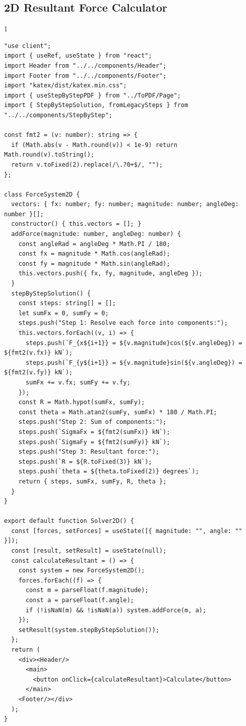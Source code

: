 \subsection*{2D Resultant Force Calculator}
\begin{spacing}{1}
\begin{Verbatim}[breaklines=true, breaksymbolleft={}, breaksymbolright={}]
"use client";
import { useRef, useState } from "react";
import Header from "../../components/Header";
import Footer from "../../components/Footer";
import "katex/dist/katex.min.css";
import { useStepByStepPDF } from "../ToPDF/Page";
import { StepByStepSolution, fromLegacySteps } from "../../components/StepByStep";

const fmt2 = (v: number): string => {
  if (Math.abs(v - Math.round(v)) < 1e-9) return Math.round(v).toString();
  return v.toFixed(2).replace(/\.?0+$/, "");
};

class ForceSystem2D {
  vectors: { fx: number; fy: number; magnitude: number; angleDeg: number }[];
  constructor() { this.vectors = []; }
  addForce(magnitude: number, angleDeg: number) {
    const angleRad = angleDeg * Math.PI / 180;
    const fx = magnitude * Math.cos(angleRad);
    const fy = magnitude * Math.sin(angleRad);
    this.vectors.push({ fx, fy, magnitude, angleDeg });
  }
  stepByStepSolution() {
    const steps: string[] = [];
    let sumFx = 0, sumFy = 0;
    steps.push("Step 1: Resolve each force into components:");
    this.vectors.forEach((v, i) => {
      steps.push(`F_{x${i+1}} = ${v.magnitude}cos(${v.angleDeg}) = ${fmt2(v.fx)} kN`);
      steps.push(`F_{y${i+1}} = ${v.magnitude}sin(${v.angleDeg}) = ${fmt2(v.fy)} kN`);
      sumFx += v.fx; sumFy += v.fy;
    });
    const R = Math.hypot(sumFx, sumFy);
    const theta = Math.atan2(sumFy, sumFx) * 180 / Math.PI;
    steps.push("Step 2: Sum of components:");
    steps.push(`SigmaFx = ${fmt2(sumFx)} kN`);
    steps.push(`SigmaFy = ${fmt2(sumFy)} kN`);
    steps.push("Step 3: Resultant force:");
    steps.push(`R = ${R.toFixed(3)} kN`);
    steps.push(`theta = ${theta.toFixed(2)} degrees`);
    return { steps, sumFx, sumFy, R, theta };
  }
}

export default function Solver2D() {
  const [forces, setForces] = useState([{ magnitude: "", angle: "" }]);
  const [result, setResult] = useState(null);
  const calculateResultant = () => {
    const system = new ForceSystem2D();
    forces.forEach((f) => {
      const m = parseFloat(f.magnitude);
      const a = parseFloat(f.angle);
      if (!isNaN(m) && !isNaN(a)) system.addForce(m, a);
    });
    setResult(system.stepByStepSolution());
  };
  return (
    <div><Header/>
      <main>
        <button onClick={calculateResultant}>Calculate</button>
      </main>
    <Footer/></div>
  );
}
\end{Verbatim}
\end{spacing}

